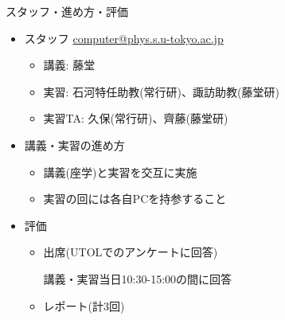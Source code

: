 \begin{frame}[t,fragile]{スタッフ・進め方・評価}
  \begin{itemize}
  \item スタッフ \href{mailto:computer@.phys.s.u-tokyo.ac.jp}{computer@phys.s.u-tokyo.ac.jp}
    \begin{itemize}
    \item 講義: 藤堂
    \item 実習: 石河特任助教(常行研)、諏訪助教(藤堂研)
    \item 実習TA: 久保(常行研)、齊藤(藤堂研)
    \end{itemize}
  \item 講義・実習の進め方
    \begin{itemize}
    \item 講義(座学)と実習を交互に実施
    \item 実習の回には各自PCを持参すること
    \end{itemize}
  \item 評価
    \begin{itemize}
    \item 出席(UTOLでのアンケートに回答)

      講義・実習当日10:30-15:00の間に回答
      
    \item レポート(計3回)
    \end{itemize}    
  \end{itemize}    
\end{frame}

